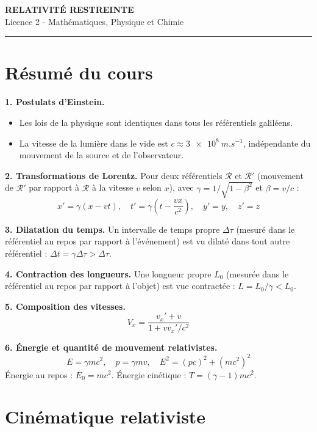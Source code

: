 \documentclass[12pt,a4paper]{article}
\begin{document}
\fi

\begin{center}
  {\LARGE\bfseries RELATIVITÉ RESTREINTE}\\[0.3cm]
  {\normalsize Licence 2 - Mathématiques, Physique et Chimie}\\[0.1cm]
  \rule{0.7\textwidth}{0.8pt}
\end{center}

\section*{Résumé du cours}

\begin{boiteresume}

\textbf{1. Postulats d'Einstein.}
\begin{itemize}[nosep]
  \item Les lois de la physique sont identiques dans tous les référentiels galiléens.
  \item La vitesse de la lumière dans le vide est $c \approx \qty{3e8}{m.s^{-1}}$, indépendante du mouvement de la source et de l'observateur.
\end{itemize}

\textbf{2. Transformations de Lorentz.} Pour deux référentiels $\mathcal{R}$ et $\mathcal{R}'$ (mouvement de $\mathcal{R}'$ par rapport à $\mathcal{R}$ à la vitesse $v$ selon $x$), avec $\gamma = 1/\sqrt{1-\beta^2}$ et $\beta = v/c$ :
\[
x' = \gamma(x-vt), \quad t' = \gamma\!\left(t-\frac{vx}{c^2}\right), \quad y'=y, \quad z'=z
\]

\textbf{3. Dilatation du temps.} Un intervalle de temps propre $\Delta\tau$ (mesuré dans le référentiel au repos par rapport à l'événement) est vu dilaté dans tout autre référentiel : $\Delta t = \gamma\Delta\tau > \Delta\tau$.

\textbf{4. Contraction des longueurs.} Une longueur propre $L_0$ (mesurée dans le référentiel au repos par rapport à l'objet) est vue contractée : $L = L_0/\gamma < L_0$.

\textbf{5. Composition des vitesses.}
\[
V_x = \frac{v_x' + v}{1 + vv_x'/c^2}
\]

\textbf{6. Énergie et quantité de mouvement relativistes.}
\[
E = \gamma mc^2, \quad p = \gamma mv, \quad E^2 = (pc)^2 + (mc^2)^2
\]
Énergie au repos : $E_0 = mc^2$. Énergie cinétique : $T = (\gamma-1)mc^2$.

\end{boiteresume}

\newpage
\section{Cinématique relativiste}
\end{document}
